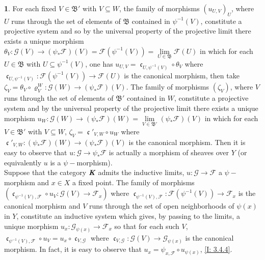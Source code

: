 \documentclass[12pt]{amsart}
\newcommand{\can}{\operatorname{\mathfrak{c}}}
\theoremstyle{definition}
\newtheorem{bk}[proposition]{}
\begin{document}
\begin{bk}
For each fixed $V\in\mathfrak{B}'$ with $V\subseteq W$, the family of morphisms $(u_{U,V})_{U}$, where $U$ runs through the set of elements of $\mathfrak{B}$ contained in $\psi^{-1}(V)$, constitute a projective system and so by the universal property of the projective limit there exists a unique morphism $\theta_{V}:\mathscr{G}(V)\rightarrow(\psi_{\ast}\mathscr{F})(V)=
\mathscr{F}(\psi^{-1}(V))=
\lim\limits_{U\in\mathfrak{B}}\mathscr{F}(U)$ in which for each
$U\in\mathfrak{B}$ with $U\subseteq\psi^{-1}(V)$, one has $u_{U,V}=\can_{U,\psi^{-1}(V)}\circ\theta_{V}$ where $\can_{U,\psi^{-1}(V)}:\mathscr{F}(\psi^{-1}(V))\rightarrow\mathscr{F}(U)$ is the canonical morphism, then take $\zeta_{V}=\theta_{V}\circ\varrho_{V}^{W}:
\mathscr{G}(W)\rightarrow(\psi_{\ast}\mathscr{F})(V)$. The family of morphisms $(\zeta_{V})$, where $V$ runs through the set of elements of $\mathfrak{B}'$ contained in $W$, constitute a projective system and by the universal property of the projective limit there exists a unique morphism $u_{W}:\mathscr{G}(W)\rightarrow(\psi_{\ast}\mathscr{F})(W)=
\lim\limits_{V\in\mathfrak{B}'}(\psi_{\ast}\mathscr{F})(V)$ in which for each $V\in\mathfrak{B}'$ with $V\subseteq W$,
$\zeta_{V}=\can'_{V,W}\circ u_{W}$ where $\can'_{V,W}:(\psi_{\ast}\mathscr{F})(W)
\rightarrow(\psi_{\ast}\mathscr{F})(V)$ is the canonical morphism. Then it is easy to observe that
 $u:\mathscr{G}\rightarrow\psi_{\ast}\mathscr{F}$ is actually a morphism of
sheaves over $Y$ (or equivalently $u$ is a $\psi-$morphism).\\
Suppose that the category $\emph{\textbf{K}}$ admits the inductive limits, $u:\mathscr{G}\rightarrow\mathscr{F}$ a $\psi-$morphism and $x\in X$ a fixed point. The family of morphisms $(\can_{\psi^{-1}(V),\mathscr{F}}\circ u_{V}:\mathscr{G}(V)\rightarrow\mathscr{F}_{x})$ where $\can_{\psi^{-1}(V),\mathscr{F}}:\mathscr{F}(\psi^{-1}(V))
\rightarrow\mathscr{F}_{x}$ is the canonical morphism and $V$ runs through the set of open neighborhoods of $\psi(x)$ in $Y$, constitute an inductive system which gives, by passing to the limits, a unique morphism $u_{x}:\mathscr{G}_{\psi(x)}\rightarrow\mathscr{F}_{x}$ so that for each such $V$, $\can_{\psi^{-1}(V),\mathscr{F}}\circ u_{V}=u_{x}\circ\can_{V,\mathscr{G}}$ where $\can_{V,\mathscr{G}}:\mathscr{G}(V)\rightarrow\mathscr{G}_{\psi(x)}$ is the canonical morphism. In fact, it is easy to observe that  $u_{x}=\psi_{x,\mathscr{F}}\circ u_{\psi(x)}$, \ref{I: 3.4.4}.\\
\end{bk}
\end{document}
